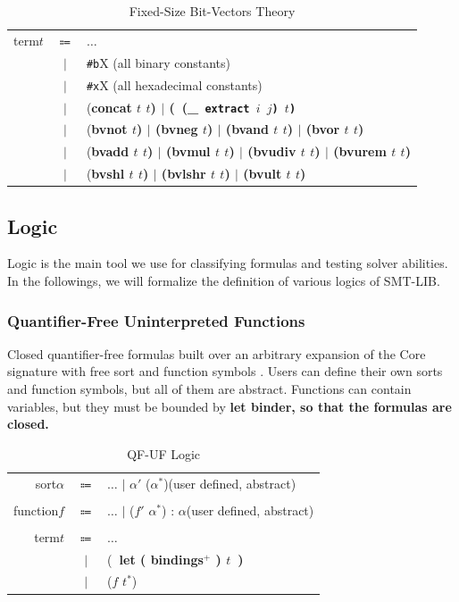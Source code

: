 \documentclass[10pt,letter]{article}
\theoremstyle{definition}
\begin{document}
\begin{table}[!h]
\begin{mdframed}
\begin{tabular}{r c l}
term\qquad $t$ & $\Coloneqq$ & $\ldots$ \\
& $\mid$ & {\tt \#b}X \rm\qquad (all binary constants)\\
& $\mid$ & {\tt \#x}X \rm\qquad (all hexadecimal constants)\\
& $\mid$ & (\bf concat \rm $t$ $t$) $\mid$ (\ (\_\tt\ {\bf extract} \rm $i$ $j$)\ $t$)\\
& $\mid$ & (\bf bvnot \rm $t$) $\mid$ (\bf bvneg \rm $t$) $\mid$ (\bf bvand \rm $t$ $t$) $\mid$ (\bf bvor \rm $t$ $t$)\\
& $\mid$ & (\bf bvadd \rm $t$ $t$) $\mid$ (\bf bvmul \rm $t$ $t$) $\mid$ (\bf bvudiv \rm $t$ $t$) $\mid$ (\bf bvurem \rm $t$ $t$)\\
& $\mid$ & (\bf bvshl \rm $t$ $t$) $\mid$ (\bf bvlshr \rm $t$ $t$) $\mid$ (\bf bvult \rm $t$ $t$) \\
\end{tabular}
\end{mdframed}
\caption{Fixed-Size Bit-Vectors Theory}
\end{table}


\subsection{Logic}

Logic is the main tool we use for classifying formulas and testing solver abilities. In the followings, we will formalize the definition of various logics of SMT-LIB.

\subsubsection{Quantifier-Free Uninterpreted Functions}
Closed quantifier-free formulas built over an arbitrary expansion of the Core signature with free sort and function symbols \cite{bs2010}. Users can define their own sorts and function symbols, but all of them are abstract. Functions can contain variables, but they must be bounded by \bf let \rm binder, so that the formulas are closed.

\begin{table}[!h]
\begin{mdframed}
\centering
\begin{tabular}{r c l}
sort\qquad $\alpha$ & $\Coloneqq$ & $\ldots$ $\mid$ $\alpha'$ ($\alpha^*$)\rm\qquad(user defined, abstract)\\
\\
function\qquad $f$ & $\Coloneqq$ & $\ldots$ $\mid$ \rm ($f'$ $\alpha^*$) : $\alpha$\qquad(user defined, abstract)\\
\\
term\qquad $t$ & $\Coloneqq$ & $\ldots$ \\
& $\mid$ & (\bf\ let \rm ( bindings$^+$ ) $t$\ )\\
& $\mid$ & ($f$ $t^*$)
\end{tabular}
\end{mdframed}
\caption{QF-UF Logic}
\end{table}
\end{document}
